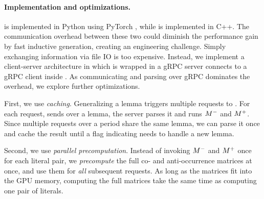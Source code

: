 


\paragraph{Implementation and optimizations.}
\tool is implemented in Python using PyTorch \cite{pytorch}, while \spc is implemented in C++. 
The communication overhead between these two could diminish the performance gain by fast inductive generation, creating an engineering challenge.  
Simply exchanging information via file IO is too expensive.
Instead, we implement a client-server architecture in which \tool is wrapped in a gRPC server connects to a gRPC client inside \spc.
As communicating and parsing over gRPC dominates the overhead, we explore further optimizations. 


First, we use \emph{caching}. Generalizing a lemma triggers multiple requests to \tool. For each request, \dpy sends over a lemma, the server parses it and runs $M^-$ and $M^+$.
Since multiple requests over a period share the same lemma, we can parse it once and cache the result until a flag indicating \tool needs to handle a new lemma.

Second, we use \emph{parallel precomputation}. Instead of invoking $M^-$ and $M^+$ once for each literal pair, we \emph{precompute} the full co- and anti-occurrence matrices at once, and use them for \emph{all} subsequent requests.
As long as the matrices fit into the GPU memory, computing the full matrices take the same time as computing one pair of literals.

